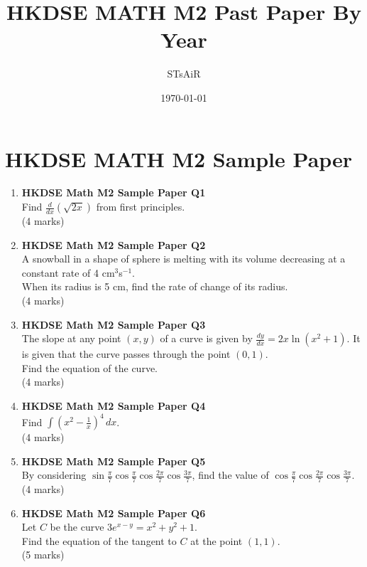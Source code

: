 \documentclass{report}
\title{\bf HKDSE MATH M2 Past Paper By Year}
\author{STsAiR}
\date{\today}
\begin{document}
\maketitle
\tableofcontents
\chapter{HKDSE MATH M2 Sample Paper}
\begin{enumerate}
	\item \textbf{HKDSE Math M2 Sample Paper Q1}\\
	Find $\displaystyle\frac{d}{dx}(\sqrt{2x})$ from first principles. \\(4 marks)

	\item \textbf{HKDSE Math M2 Sample Paper Q2}\\
	A snowball in a shape of sphere is melting with its volume decreasing at a constant rate of 4 cm$^3$s$^{-1}$. \\
	When its radius is 5 cm, find the rate of change of its radius. \\(4 marks)

	\item \textbf{HKDSE Math M2 Sample Paper Q3}\\
	The slope at any point $(x,y)$ of a curve is given by $\displaystyle\frac{dy}{dx} = 2x \ln{(x^2+1)}$. It is given that the curve passes through the point $(0,1)$.\\Find the equation of the curve. \\(4 marks)
		
	\item \textbf{HKDSE Math M2 Sample Paper Q4}\\
	Find $\displaystyle\int\left(x^2-\frac{1}{x}\right)^4 \,dx$. \\(4 marks)

	\item \textbf{HKDSE Math M2 Sample Paper Q5}\\
	By considering $\displaystyle\sin{\frac{\pi}{7}}\cos{\frac{\pi}{7}}\cos{\frac{2\pi}{7}}\cos{\frac{3\pi}{7}}$, find the value of $\displaystyle\cos{\frac{\pi}{7}}\cos{\frac{2\pi}{7}}\cos{\frac{3\pi}{7}}$. \\(4 marks)

	\item \textbf{HKDSE Math M2 Sample Paper Q6}\\
	Let $C$ be the curve $3e^{x-y} = x^2+y^2+1$. \\
	Find the equation of the tangent to $C$ at the point $(1,1)$. \\(5 marks)


\end{enumerate}
\end{document}
